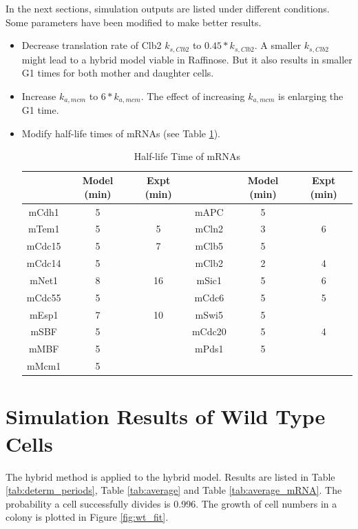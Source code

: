 \documentclass[12pt]{article}
\begin{document}
In the next sections, simulation outputs are listed under different conditions. 
Some parameters have been modified to make better results. 
\begin{itemize}
  \item[(1)] Decrease translation rate of Clb2 $k_{s,Clb2}$ to $0.45*k_{s,Clb2}$. A smaller $k_{s,Clb2}$ might lead to a hybrid model viable in Raffinose. But it also results in smaller G1 times for both mother and daughter cells. 
  \item[(2)] Increase $k_{a,mcm}$ to $6*k_{a,mcm}$. The effect of increasing $k_{a,mcm}$ is enlarging the G1 time.
  \item[(3)] Modify half-life times of mRNAs (see Table \ref{tab:half_time}).
\begin{table}[H]
  \centering
  \caption{Half-life Time of mRNAs}
  \vspace{0.2in}
  \begin{tabular}{|c|cc|c|cc|}
  \hline
        & Model (min) & Expt (min) & &  Model (min) & Expt (min)\\
  \hline
  \hline
  mCdh1 &  5 &    &    mAPC  &  5   &     \\
  mTem1 &  5 &  5 &    mCln2 &  3   &  6  \\
 mCdc15 &  5 &  7 &    mClb5 &  5   &     \\
 mCdc14 &  5 &    &    mClb2 &  2   &  4  \\
  mNet1 &  8 & 16 &    mSic1 &  5   &  6  \\
mCdc55  &  5 &    &    mCdc6 &  5   &  5  \\
  mEsp1 &  7 & 10 &    mSwi5 &  5   &     \\
  mSBF  &  5 &    &    mCdc20 & 5   &  4  \\
  mMBF  &  5 &    &    mPds1 &  5   &     \\
  mMcm1 &  5 &    &          &      &     \\
  \hline
  \end{tabular}
  \label{tab:half_time}
\end{table}

\end{itemize}


\newpage
\section{Simulation Results of Wild Type Cells}
The hybrid method is applied to the hybrid model.
Results are listed in Table \ref{tab:determ_periods}, Table \ref{tab:average} and 
Table \ref{tab:average_mRNA}.
The probability a cell successfully divides is 0.996. The growth of cell numbers in a colony is
plotted in Figure \ref{fig:wt_fit}.
\end{document}
